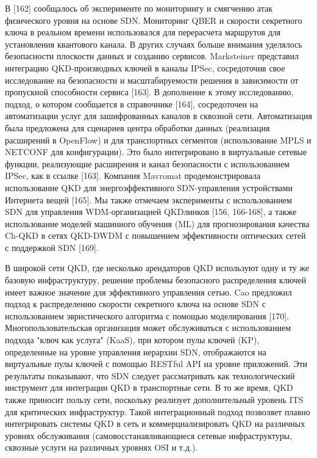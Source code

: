 В [162] сообщалось об эксперименте по мониторингу и смягчению атак физического уровня на основе SDN. Мониторинг QBER и скорости секретного ключа в реальном времени использовался для перерасчета маршрутов для установления квантового канала.
В других случаях больше внимания уделялось безопасности плоскости данных и созданию сервисов. Marksteiner представил интеграцию QKD-производных ключей в каналы IPSec, сосредоточив свое исследование на безопасности и масштабируемости решения в зависимости от пропускной способности сервиса [163]. В дополнение к этому исследованию, подход, о котором сообщается в справочнике [164], сосредоточен на автоматизации услуг для зашифрованных каналов в сквозной сети. Автоматизация была предложена для сценариев центра обработки данных (реализация расширений в OpenFlow) и для транспортных сегментов (использование MPLS и NETCONF для конфигурации). Это было интегрировано в виртуальные сетевые функции, реализующие расширения и канал безопасности с использованием IPSec, как в ссылке [163]. Компания Mavromat продемонстрировала использование QKD для энергоэффективного SDN-управления устройствами Интернета вещей [165].
Мы также отмечаем эксперименты с использованием SDN для управления WDM-организацией QKDлинков [156, 166-168], а также использование моделей машинного обучения (ML) для прогнозирования качества Ch-QKD в сетях QKD-DWDM с повышением эффективности оптических сетей с поддержкой SDN [169].

В широкой сети QKD, где несколько арендаторов QKD используют одну и ту же базовую инфраструктуру, решение проблемы безопасного распределения ключей имеет важное значение для эффективного управления сетью. Cao предложил подход к распределению скорости секретного ключа на основе SDN с использованием эвристического алгоритма с помощью моделирования [170].
Многопользовательская организация может обслуживаться с использованием подхода "ключ как услуга" (KaaS), при котором пулы ключей (KP), определенные на уровне управления иерархии SDN, отображаются на виртуальные пулы ключей с помощью RESTful API на уровне приложений.
Эти результаты показывают, что SDN следует рассматривать как технологический инструмент для интеграции QKD в транспортные сети. В то же время, QKD также приносит пользу сети, поскольку реализует дополнительный уровень ITS для критических инфраструктур. Такой интеграционный подход позволяет плавно интегрировать системы QKD в сеть и коммерциализировать QKD на различных уровнях обслуживания (самовосстанавливающиеся сетевые инфраструктуры, сквозные услуги на различных уровнях OSI и т.д.).

